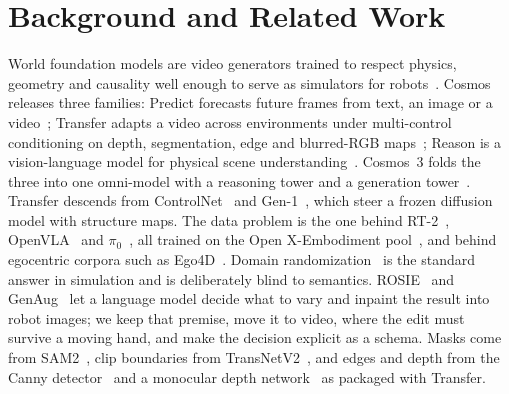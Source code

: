\section{Background and Related Work}

World foundation models are video generators trained to respect physics, geometry and causality well enough to serve as simulators for robots~\cite{cosmos2025}. Cosmos releases three families: Predict forecasts future frames from text, an image or a video~\cite{cosmospredict2}; Transfer adapts a video across environments under multi-control conditioning on depth, segmentation, edge and blurred-RGB maps~\cite{cosmostransfer1,cosmos25}; Reason is a vision-language model for physical scene understanding~\cite{cosmosreason1}. Cosmos~3 folds the three into one omni-model with a reasoning tower and a generation tower~\cite{cosmos3}. Transfer descends from ControlNet~\cite{controlnet} and Gen-1~\cite{gen1}, which steer a frozen diffusion model with structure maps. The data problem is the one behind RT-2~\cite{rt2}, OpenVLA~\cite{openvla} and $\pi_0$~\cite{pi0}, all trained on the Open X-Embodiment pool~\cite{oxe}, and behind egocentric corpora such as Ego4D~\cite{ego4d}. Domain randomization~\cite{tobin2017} is the standard answer in simulation and is deliberately blind to semantics. ROSIE~\cite{rosie} and GenAug~\cite{genaug} let a language model decide what to vary and inpaint the result into robot images; we keep that premise, move it to video, where the edit must survive a moving hand, and make the decision explicit as a schema. Masks come from SAM2~\cite{sam2}, clip boundaries from TransNetV2~\cite{transnetv2}, and edges and depth from the Canny detector~\cite{canny1986} and a monocular depth network~\cite{depthanything} as packaged with Transfer.
